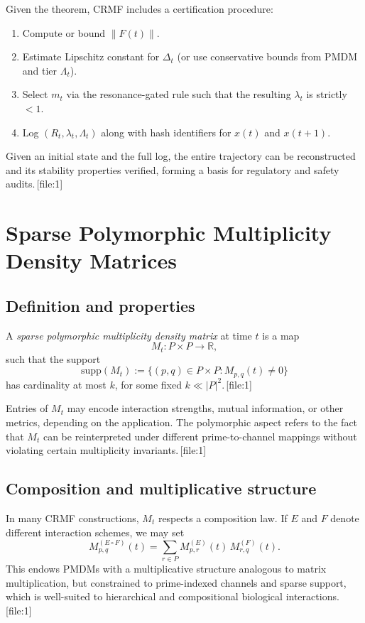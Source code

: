 \documentclass[11pt]{article}
\begin{document}
Given the theorem, CRMF includes a certification procedure:
\begin{enumerate}[leftmargin=1.5em]
  \item Compute or bound $\|F(t)\|$.
  \item Estimate Lipschitz constant for $\Delta_t$ (or use conservative bounds from PMDM and tier $\Lambda_t$).
  \item Select $m_t$ via the resonance-gated rule such that the resulting $\lambda_t$ is strictly $< 1$.
  \item Log $(R_t, \lambda_t, \Lambda_t)$ along with hash identifiers for $x(t)$ and $x(t+1)$.
\end{enumerate}
Given an initial state and the full log, the entire trajectory can be reconstructed and its stability properties verified, forming a basis for regulatory and safety audits.\,[file:1]

\section{Sparse Polymorphic Multiplicity Density Matrices}

\subsection{Definition and properties}

\begin{definition}
A \emph{sparse polymorphic multiplicity density matrix} at time $t$ is a map
\[
  M_t : P \times P \to \mathbb{R},
\]
such that the support
\[
  \mathrm{supp}(M_t) := \{(p,q) \in P \times P : M_{p,q}(t) \neq 0\}
\]
has cardinality at most $k$, for some fixed $k \ll |P|^2$.\,[file:1]
\end{definition}

Entries of $M_t$ may encode interaction strengths, mutual information, or other metrics, depending on the application.
The polymorphic aspect refers to the fact that $M_t$ can be reinterpreted under different prime-to-channel mappings without violating certain multiplicity invariants.\,[file:1]

\subsection{Composition and multiplicative structure}

In many CRMF constructions, $M_t$ respects a composition law.
If $E$ and $F$ denote different interaction schemes, we may set
\[
  M^{(E \circ F)}_{p,q}(t) = \sum_{r \in P} M^{(E)}_{p,r}(t)\, M^{(F)}_{r,q}(t).
\]
This endows PMDMs with a multiplicative structure analogous to matrix multiplication, but constrained to prime-indexed channels and sparse support, which is well-suited to hierarchical and compositional biological interactions.\,[file:1]
\end{document}
